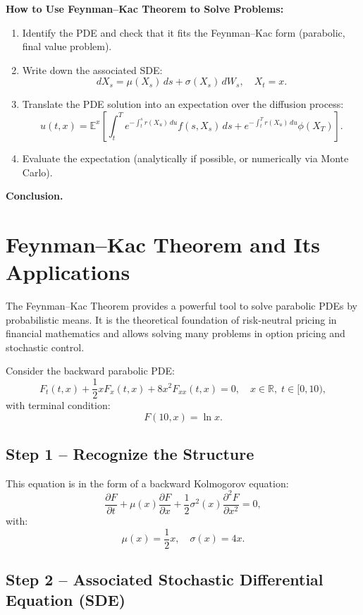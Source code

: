 \textbf{How to Use Feynman–Kac Theorem to Solve Problems:}
\begin{enumerate}
    \item Identify the PDE and check that it fits the Feynman–Kac form (parabolic, final value problem).
    \item Write down the associated SDE:
    \[
    dX_s = \mu(X_s)\,ds + \sigma(X_s)\,dW_s, \quad X_t = x.
    \]
    \item Translate the PDE solution into an expectation over the diffusion process:
    \[
    u(t,x) = \mathbb{E}^x \left[ \int_t^T e^{-\int_t^s r(X_u)\,du} f(s,X_s)\,ds + e^{-\int_t^T r(X_u)\,du} \phi(X_T) \right].
    \]
    \item Evaluate the expectation (analytically if possible, or numerically via Monte Carlo).
\end{enumerate}

\textbf{Conclusion.}  

\section{Feynman–Kac Theorem and Its Applications}

The Feynman–Kac Theorem provides a powerful tool to solve parabolic PDEs by probabilistic means. It is the theoretical foundation of risk-neutral pricing in financial mathematics and allows solving many problems in option pricing and stochastic control.


Consider the backward parabolic PDE:
\[
F_t(t,x) + \frac{1}{2}x F_x(t,x) + 8x^2 F_{xx}(t,x) = 0, \quad x \in \mathbb{R}, \; t \in [0,10),
\]
with terminal condition:
\[
F(10,x) = \ln x.
\]

\subsection*{Step 1 – Recognize the Structure}

This equation is in the form of a backward Kolmogorov equation:
\[
\frac{\partial F}{\partial t} + \mu(x) \frac{\partial F}{\partial x} + \frac{1}{2} \sigma^2(x) \frac{\partial^2 F}{\partial x^2} = 0,
\]
with:
\[
\mu(x) = \frac{1}{2}x, \quad \sigma(x) = 4x.
\]

\subsection*{Step 2 – Associated Stochastic Differential Equation (SDE)}

